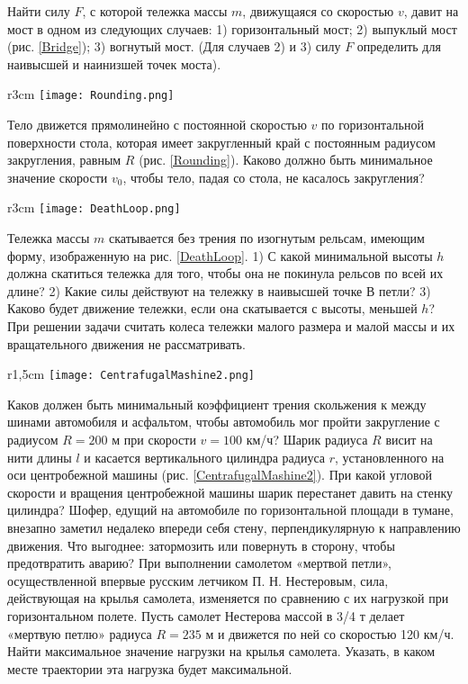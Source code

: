 \AddProb Найти силу $F$, с которой тележка массы $m$, движущаяся со скоростью $v$, давит на мост в одном из следующих случаев: 1) горизонтальный мост; 2) выпуклый мост (рис. \ref{Bridge}); 3) вогнутый мост. (Для случаев 2) и 3) силу $F$ определить для наивысшей и наинизшей точек моста).

\begin{wrapfigure}[6]{r}{3cm}
\texttt{[image: Rounding.png]}
\caption{}
\label{Rounding}
\end{wrapfigure}
\AddProb Тело движется прямолинейно с постоянной скоростью $v$ по
горизонтальной поверхности стола, которая имеет закругленный край
с постоянным радиусом закругления, равным $R$ (рис. \ref{Rounding}). Каково должно быть минимальное значение скорости $v_0$, чтобы тело, падая со стола, не касалось закругления?

\begin{wrapfigure}[9]{r}{3cm}
\texttt{[image: DeathLoop.png]}
\caption{}
\label{DeathLoop}
\end{wrapfigure}
\AddProb Тележка массы $m$ скатывается без трения по изогнутым
рельсам, имеющим форму, изображенную на рис. \ref{DeathLoop}. 1) С какой минимальной высоты $h$ должна скатиться тележка для того, чтобы она не покинула рельсов по всей их длине? 2) Какие силы действуют на тележку в наивысшей точке $В$ петли? 3) Каково будет движение тележки, если она скатывается с высоты, меньшей $h$? При решении задачи считать колеса тележки малого размера и малой массы и их вращательного движения не рассматривать.

\begin{wrapfigure}[9]{r}{1,5cm}
\texttt{[image: CentrafugalMashine2.png]}
\caption{}
\label{CentrafugalMashine2}
\end{wrapfigure}
\AddProb Каков должен быть минимальный коэффициент трения скольжения к между шинами автомобиля и асфальтом, чтобы автомобиль мог пройти закругление с радиусом $R = 200$ м при скорости $v = 100$ км/ч?
\AddProb Шарик радиуса $R$ висит на нити длины $l$ и касается вертикального цилиндра радиуса $r$, установленного на оси центробежной машины (рис. \ref{CentrafugalMashine2}). При какой угловой скорости и вращения центробежной машины шарик перестанет давить на стенку цилиндра?
\AddProb Шофер, едущий на автомобиле по горизонтальной площади в тумане, внезапно заметил недалеко впереди себя стену, перпендикулярную к направлению движения. Что выгоднее: затормозить или повернуть в сторону, чтобы предотвратить аварию?
\AddProb При выполнении самолетом «мертвой петли», осуществленной
впервые русским летчиком П. Н. Нестеровым, сила, действующая на
крылья самолета, изменяется по сравнению с их нагрузкой при горизонтальном полете. Пусть самолет Нестерова массой в 3/4 т делает «мертвую петлю» радиуса $R = 235$ м и движется по ней со скоростью 120 км/ч. Найти максимальное значение нагрузки на крылья самолета. Указать, в каком месте траектории эта нагрузка будет максимальной.

